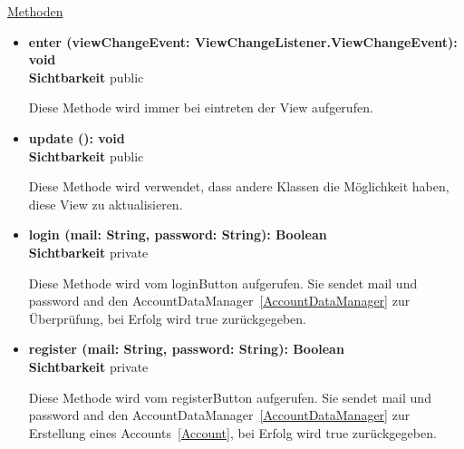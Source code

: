 \underline{Methoden}
\begin{itemize}
\itemsep0pt
\item \textbf{enter (viewChangeEvent: ViewChangeListener.ViewChangeEvent): void}\hfill\\
\textbf{Sichtbarkeit} public

Diese Methode wird immer bei eintreten der View aufgerufen.

\item \textbf{update (): void}\hfill\\
\textbf{Sichtbarkeit} public

Diese Methode wird verwendet, dass andere Klassen die Möglichkeit haben, diese View zu aktualisieren.


\item \textbf{login (mail: String, password: String): Boolean} \hfill\\ 
\textbf{Sichtbarkeit} private

Diese Methode wird vom loginButton aufgerufen. Sie sendet mail und password and den AccountDataManager~\eqref{AccountDataManager} zur Überprüfung, bei Erfolg wird true zurückgegeben.

\item \textbf{register (mail: String, password: String): Boolean}\hfill\\
\textbf{Sichtbarkeit} private

Diese Methode wird vom registerButton aufgerufen. Sie sendet mail und password and den AccountDataManager~\eqref{AccountDataManager} zur Erstellung eines Accounts~\eqref{Account}, bei Erfolg wird true zurückgegeben.

\end{itemize}
